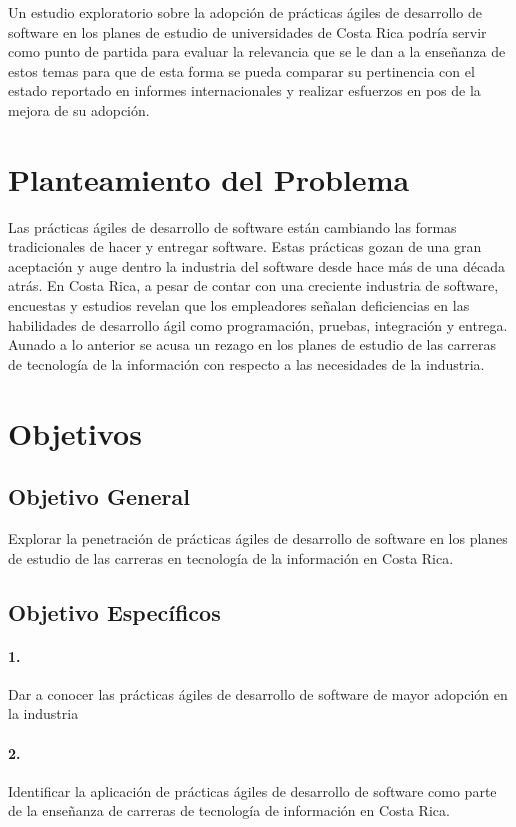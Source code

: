 Un estudio exploratorio sobre la adopción de prácticas ágiles de desarrollo de software en los planes de estudio de universidades de Costa Rica podría servir como punto de partida para evaluar la relevancia que se le dan a la enseñanza de estos temas para que de esta forma se pueda comparar su pertinencia con el estado reportado en informes internacionales y realizar esfuerzos en pos de la mejora de su adopción.  




\section{Planteamiento del Problema}
Las prácticas ágiles de desarrollo de software están cambiando las formas tradicionales de hacer y entregar software. Estas prácticas gozan de una gran aceptación y auge dentro la industria del software desde hace más de una década atrás. En Costa Rica, a pesar de contar con una creciente industria de software, encuestas y estudios revelan que los empleadores señalan deficiencias en las habilidades de desarrollo ágil como programación, pruebas, integración y entrega. Aunado a lo anterior se acusa un rezago en los planes de estudio de las carreras de tecnología de la información con respecto a las necesidades de la industria.

\section{Objetivos}

\subsection{Objetivo General}
Explorar la penetración de prácticas ágiles de desarrollo de software en los planes de estudio de las carreras en tecnología de la información en Costa Rica.

\subsection{Objetivo Específicos}

\paragraph{1.} Dar a conocer las prácticas ágiles de desarrollo de software de mayor adopción en la industria \label{sec:objetivo-especifico-1}

\paragraph{2.} Identificar la aplicación de prácticas ágiles de desarrollo de software como parte de la enseñanza de carreras de tecnología de información en Costa Rica. \label{sec:objetivo-especifico-2}

